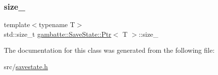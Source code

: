 \subsubsection{\texorpdfstring{size\+\_\+}{size\_}}
{\footnotesize\ttfamily template$<$typename T$>$ \\
std\+::size\+\_\+t \hyperlink{classgambatte_1_1SaveState_1_1Ptr}{gambatte\+::\+Save\+State\+::\+Ptr}$<$ T $>$\+::size\+\_\+\hspace{0.3cm}{\ttfamily [private]}}



The documentation for this class was generated from the following file\+:\begin{DoxyCompactItemize}
\item 
src/\hyperlink{savestate_8h}{savestate.\+h}\end{DoxyCompactItemize}
